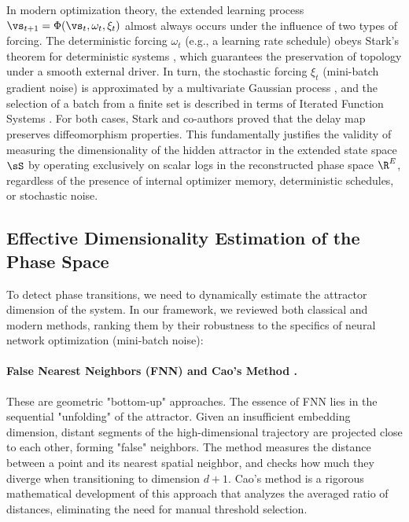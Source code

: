\documentclass{article}
\begin{document}
In modern optimization theory, the extended learning process $\vs_{t+1} = \Phi(\vs_t, \omega_t, \xi_t)$ almost always occurs under the influence of two types of forcing. The deterministic forcing $\omega_t$ (e.g., a learning rate schedule) obeys Stark's theorem for deterministic systems \citep{stark1999delay}, which guarantees the preservation of topology under a smooth external driver. In turn, the stochastic forcing $\xi_t$ (mini-batch gradient noise) is approximated by a multivariate Gaussian process \citep{mandt2017stochastic}, and the selection of a batch from a finite set is described in terms of Iterated Function Systems \citep{stark2003delay}. For both cases, Stark and co-authors proved that the delay map preserves diffeomorphism properties. This fundamentally justifies the validity of measuring the dimensionality of the hidden attractor in the extended state space $\sS$ by operating exclusively on scalar logs in the reconstructed phase space $\R^E$, regardless of the presence of internal optimizer memory, deterministic schedules, or stochastic noise.

\subsection{Effective Dimensionality Estimation of the Phase Space}\label{sec:theory_dim}

To detect phase transitions, we need to dynamically estimate the attractor dimension of the system. In our framework, we reviewed both classical and modern methods, ranking them by their robustness to the specifics of neural network optimization (mini-batch noise):

\paragraph{False Nearest Neighbors (FNN) \citep{kennel1992determining} and Cao's Method \citep{cao1997practical}.}
These are geometric "bottom-up" approaches. The essence of FNN lies in the sequential "unfolding" of the attractor. Given an insufficient embedding dimension, distant segments of the high-dimensional trajectory are projected close to each other, forming "false" neighbors. The method measures the distance between a point and its nearest spatial neighbor, and checks how much they diverge when transitioning to dimension $d+1$. Cao's method is a rigorous mathematical development of this approach that analyzes the averaged ratio of distances, eliminating the need for manual threshold selection.
\end{document}
